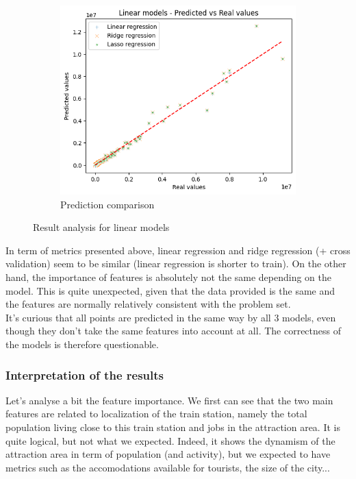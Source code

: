 \begin{figure}[h]
     \hfill
     \begin{subfigure}[b]{0.3\textwidth}
         \centering
         \includegraphics[width=\textwidth]{assets/images/linear-vs-ridge-vs-lasso-prediction.png}
         \caption{Prediction comparison}
     \end{subfigure}
     \caption{Result analysis for linear models}
\end{figure}
In term of metrics presented above, linear regression and ridge regression (+ cross validation) seem to be similar (linear regression is shorter to train). On the other hand, the importance of features is absolutely not the same depending on the model. This is quite unexpected, given that the data provided is the same and the features are normally relatively consistent with the problem set.
\\

It's curious that all points are predicted in the same way by all 3 models, even though they don't take the same features into account at all. The correctness of the models is therefore questionable.


\subsubsection{Interpretation of the results}
Let's analyse a bit the feature importance. We first can see that the two main features are related to localization of the train station, namely the total population living close to this train station and jobs in the attraction area. It is quite logical, but not what we expected. Indeed, it shows the dynamism of the attraction area in term of population (and activity), but we expected to have metrics such as the accomodations available for tourists, the size of the city...